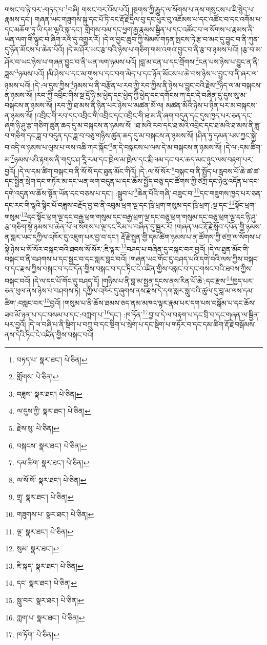གསང་བ་ཉེ་བར་:གཏད་པ་\footnote{བཏད་པ་  སྣར་ཐང་།  པེ་ཅིན། }བཞི། གསང་བར་འོས་པའོ། །སྔགས་ཀྱི་རྒྱུད་ལ་སོགས་པ་ནས་གསུངས་པ་ཇི་སྙེད་པ་རྣམས་དང་། གཞན་ཡང་གཟུགས་སྐུ་དང་པོ་ཏི་དང་རྡོ་རྗེ་དྲིལ་བུ་དང་ཕུར་བུ་འཇོམས་པ་དང་འཚོང་བ་དང་འགོམ་པ་དང་མཆོག་ཏུ་ཡི་དམ་ལྷའི་སྐུ་དང་། གླེགས་བམ་དང་ཕྱག་རྒྱ་རྣམས་སྦྱིན་པ་དང་འཚོང་བ་ལ་སོགས་པ་རྣམས་ནི་ཡན་ལག་གི་ལྟུང་བ་ཞིག་རལ་དུ་འགྱུར་རོ། །དེ་ལ་བྱང་ཆུབ་ཀྱི་སེམས་གཏན་སྤངས་ཏེ་རྩ་བ་མང་དུ་བྱུང་བ་ནི་ཀུན་དུ་ཉོན་མོངས་པ་ཆེན་པོའོ། །དེ་མ་ཤོར་ཡང་རྩ་བའི་ཉེས་པ་གཅིག་གམ་འགའ་བྱུང་བ་ནི་རྩ་བ་ཉམས་པའོ། །རྩ་བ་མ་ཤོར་བ་ཡང་ཉེས་པ་གཞན་བྱུང་བ་ནི་ཡན་ལག་ཉམས་པའོ། །བླ་མ་ངན་པ་དང་གྲོགས་\footnote{གློགས་  པེ་ཅིན། }ངན་པས་ཉེས་པ་བྱུང་ན་ནི་ཟླས་\footnote{བཟླས་  སྣར་ཐང་།  པེ་ཅིན། }ཉམས་པའོ། །མི་ཤེས་པ་དང་མ་གུས་པ་དང་བག་མེད་པ་དང་ཉོན་མོངས་པ་ཆེ་བས་ཉེས་པ་བྱུང་བ་ནི་ཞར་ལ་ཉམས་པའོ། །དེ་:ལ་དུས་ཀྱིས་\footnote{ལ་དུས་ཀྱི་  སྣར་ཐང་།  པེ་ཅིན། }ཉམས་པ་ནི་བརྩོན་པ་རབ་ཀྱི་རབ་ཀྱིས་ནི་ཉེས་པ་བྱུང་བའི་རྗེས་\footnote{རྗེས་སུ་  པེ་ཅིན། }ཉིད་ལ་མ་བསྐངས་ན་ཉམས་སོ། །རབ་ཀྱི་འབྲིང་གིས་སྔ་དྲོ་ཉི་མ་ཕྱེད་དང་ཕྱེད་ཀྱི་ཕྱེད་དང་དགོངས་ཀ་དང་དེ་བཞིན་དུ་དུས་སུ་མ་བསྐངས་ན་ཉམས་སོ། །རབ་ཀྱི་ཐ་མས་ནི་ཉིན་པར་ཉེས་པ་མཚན་མོ་ལ། མཚན་མོའི་ཉེས་པ་ཉིན་པར་མ་བསྐངས་ན་ཉམས་སོ། །འབྲིང་གི་རབ་དང་འབྲིང་གི་འབྲིང་དང་འབྲིང་གི་ཐ་མ་ནི་ཞག་བདུན་དང་དུས་ཁྱད་པར་ཅན་དང་ཞག་ཉི་ཤུ་རྩ་གཅིག་ཚུན་ཆད་དུ་མ་བསྐངས་ན་ཉམས་སོ། །ཐ་མའི་རབ་དང་ཐ་མའི་འབྲིང་དང་ཐ་མའི་ཐ་མས་ནི་ཟླ་བ་གཅིག་དང་ཟླ་བ་བདུན་དང་ཟླ་བ་བཅུ་གཉིས་ཚུན་ཆད་དུ་མ་བསྐངས་ན་ཉམས་སོ། །ཤིན་ཏུ་དམན་པས་ཀྱང་སྐྱེ་བ་འདི་ལ་ཉམས་པ་ལུས་པ་ལས་འཆི་ཀར་སྐོང་\footnote{བསྐངས་  སྣར་ཐང་།  པེ་ཅིན། }ན་དེ་བསྐངས་པ་ལས་དེ་མ་བསྐངས་ན་ཉམས་སོ། །དེ་ལ་:དམ་ཚིག་མ་\footnote{དམ་ཚིག་  སྣར་ཐང་།  པེ་ཅིན། }ཉམས་པའི་རྟགས་ནི་གདུང་ཤ་རཱི་རམ་དང་ཁྲེལ་མ་ཁྲེལ་དང་རྨི་ལམ་དང་བར་ཆད་མང་ཉུང་ལས་བརྟག་པར་བྱའོ། །དེ་ལ་དམ་ཚིག་བསྐང་བ་ནི་སོ་སོ་དང་ཐུན་མོང་གིའོ། །དེ་:ལ་སོ་སོར་\footnote{ལ་སོ་སོ་  སྣར་ཐང་།  པེ་ཅིན། }བསྐང་བ་ནི་སྤྱོད་པ་རླབས་པོ་ཆེ་ཚ་ཚ་དང་སྦྱིན་སྲེག་དང་གཏོར་མ་དང་ཡན་ལག་བདུན་པ་དང་ཆོས་སྤྱོད་བཅུ་དང་ཚོགས་ཀྱི་ཙཀྲ་དང་ཉེའུ་འདོན་པ་དང་དགེ་འདུན་ལ་ཆོས་སྟོན་ཡོན་དང་བཅས་པ་དང་། :སྒྲུབ་པ་\footnote{གྲྭ་  སྣར་ཐང་།  པེ་ཅིན། }ཆེན་པོའི་གཞི་:བཟུང་བ་\footnote{གཟུགས་པ་  སྣར་ཐང་།  པེ་ཅིན། }དང་གཟུགས་ཁྱད་པར་ཅན་དང་རང་གི་ལྷའི་སྙིང་པོ་བཟླས་བརྗོད་བྱ་བ་ནི་འབུམ་ཕྲག་ལྔ་དང་ཁྲི་ཕྲག་གསུམ་དང་ཁྲི་ཕྲག་:ལྔ་དང་\footnote{ལྔ་  སྣར་ཐང་།  པེ་ཅིན། }སྟོང་ཕྲག་གསུམ་\footnote{སུམ་  སྣར་ཐང་། }དང་སྟོང་ཕྲག་ལྔ་དང་བརྒྱ་ཕྲག་གསུམ་དང་བརྒྱ་ཕྲག་ལྔ་དང་བཅུ་ཕྲག་གསུམ་དང་བཅུ་ཕྲག་ལྔ་དང་ཉི་ཤུ་རྩ་གཅིག་སྟེ་ཉམས་པ་ཆེན་པོ་ལ་སོགས་པ་ལྔ་དང་རིམ་པ་བཞིན་དུ་སྦྱར་རོ། །གཞན་ཡང་རྡོ་རྗེ་སློབ་དཔོན་གྱི་ཉམས་ན་སླར་ཡང་དཀྱིལ་འཁོར་དུ་འཇུག་པར་བྱ་བ་དང་། རྡོ་རྗེ་སྤུན་གྱི་དམ་ཚིག་ཉམས་པ་ན་ཚོགས་ཀྱི་ཙཀྲ་ལ་སོགས་པ་སྟེ་ཉེས་པ་སོ་སོར་བསྐང་བའི་ཐབས་སོ་སོར་:ཇི་ལྟར་\footnote{ཇི་སྐད་  སྣར་ཐང་།  པེ་ཅིན། }བཤད་པ་བཞིན་དུ་བསྐང་བར་བྱའོ། །དེ་ལ་ཐུན་མོང་གི་བསྐང་བ་ནི་བཤགས་པ་དང་སྦྱང་བ་དང་སླར་བླང་བའོ། །གཞན་ཡང་གོང་དུ་བཤད་པའི་དགེ་བའི་ལས་ཀྱིས་བསྐང་བ་དང་རྫས་ཀྱིས་བསྐང་བ་དང་དོན་གྱིས་བསྐང་བ་དང་ཏིང་ངེ་འཛིན་གྱིས་བསྐང་བ་དང་གསང་བའི་ཐབས་ཀྱིས་བསྐང་བའོ། །དེ་ལ་དང་པོ་གོང་དུ་བཤད་དོ། །གཉིས་པ་ནི་བླ་མ་སྤྱན་དྲངས་ནས་རིན་པོ་ཆེ་:དང་རྫས་\footnote{དང་  སྣར་ཐང་།  པེ་ཅིན། }ཁྱད་པར་ཅན་ཕུལ་ནས་ཉེས་པ་བཤགས་ཏེ། དཀྱིལ་འཁོར་དུ་ཞུགས་ནས་རྫས་དེ་དག་སླར་སླུ་བའི་ཚུལ་དུ་བླ་མ་ལས་དམ་ཚིག་:བསླང་བར་\footnote{སླུ་བར་  སྣར་ཐང་།  པེ་ཅིན། }བྱའོ། །གསུམ་པ་ནི་ཆོས་ཐམས་ཅད་ནམ་མཁའ་ལྟར་རྣམ་པར་དག་པས་བསྒོམ་པ་དང་ཆོས་ཟབ་མོ་ཉན་པ་དང་བསམ་པ་དང་:བཀླག་པ་\footnote{ཀླག་པ་  སྣར་ཐང་།  པེ་ཅིན། }དང་། :ཁ་ཏོན་\footnote{ཁ་ཏོག་  པེ་ཅིན། }བྱ་བ་དེ་ལ་བརྟག་པ་དང་བྲི་བ་དང་གཞན་ལ་སྦྱིན་པར་བྱའོ། །དེ་ལ་བཞི་པ་ནི་སྡིག་པ་བཀྲུ་བ་དང་སྡིག་པ་སྲེག་པ་དང་སྡིག་པ་གཏོར་བ་དང་དམ་ཚིག་རྡོ་རྗེ་བསྒོམས་ནས་དེའི་ཏིང་ངེ་འཛིན་གྱིས་བསྐང་བའོ། 